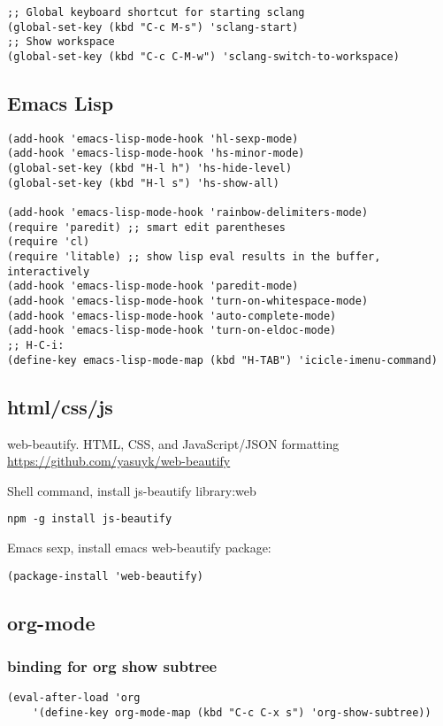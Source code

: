 \documentclass[nofonts]{tufte-handout}
\begin{document}
\begin{verbatim}
;; Global keyboard shortcut for starting sclang
(global-set-key (kbd "C-c M-s") 'sclang-start)
;; Show workspace
(global-set-key (kbd "C-c C-M-w") 'sclang-switch-to-workspace)
\end{verbatim}
\subsection{Emacs Lisp}
\label{sec-2-3}
\begin{verbatim}
(add-hook 'emacs-lisp-mode-hook 'hl-sexp-mode)
(add-hook 'emacs-lisp-mode-hook 'hs-minor-mode)
(global-set-key (kbd "H-l h") 'hs-hide-level)
(global-set-key (kbd "H-l s") 'hs-show-all)

(add-hook 'emacs-lisp-mode-hook 'rainbow-delimiters-mode)
(require 'paredit) ;; smart edit parentheses
(require 'cl)
(require 'litable) ;; show lisp eval results in the buffer, interactively
(add-hook 'emacs-lisp-mode-hook 'paredit-mode)
(add-hook 'emacs-lisp-mode-hook 'turn-on-whitespace-mode)
(add-hook 'emacs-lisp-mode-hook 'auto-complete-mode)
(add-hook 'emacs-lisp-mode-hook 'turn-on-eldoc-mode)
;; H-C-i:
(define-key emacs-lisp-mode-map (kbd "H-TAB") 'icicle-imenu-command)
\end{verbatim}
\subsection{html/css/js}
\label{sec-2-4}

web-beautify.
HTML, CSS, and JavaScript/JSON formatting
\url{https://github.com/yasuyk/web-beautify}

Shell command, install js-beautify library:web
\begin{verbatim}
npm -g install js-beautify
\end{verbatim}
Emacs sexp, install emacs web-beautify package:
\begin{verbatim}
(package-install 'web-beautify)
\end{verbatim}

\subsection{org-mode}
\label{sec-2-5}
\subsubsection{binding for org show subtree}
\label{sec-2-5-1}

\begin{verbatim}
(eval-after-load 'org
    '(define-key org-mode-map (kbd "C-c C-x s") 'org-show-subtree))
\end{verbatim}
\end{document}
